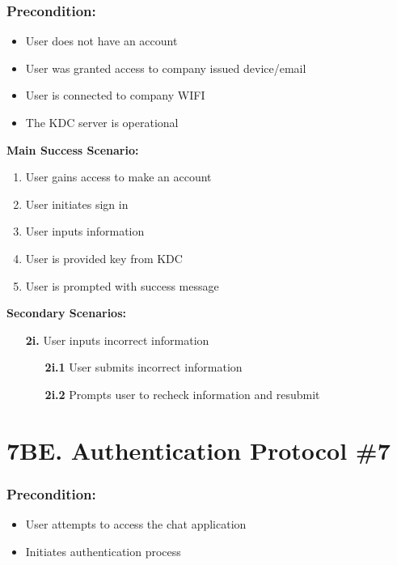 \documentclass[]{article}
\begin{document}
\subsubsection*{Precondition:}
\begin{itemize}
	\item User does not have an account
	\item User was granted access to company issued device/email
	\item User is connected to company WIFI
	\item The KDC server is operational
\end{itemize}
\textbf{Main Success Scenario:}
\begin{enumerate}
	\item User gains access to make an account
	\item User initiates sign in
	\item User inputs information
	\item User is provided key from KDC
	\item User is prompted with success message
\end{enumerate}
\textbf{Secondary Scenarios:}
\begin{enumerate}
	\item[\textbf{2i.}] User inputs incorrect information
		\begin{enumerate}
			\item[\textbf{2i.1}] User submits incorrect information
			\item[\textbf{2i.2}] Prompts user to recheck information and resubmit
		\end{enumerate}
\end{enumerate}

\section*{7BE. Authentication Protocol \#7}
\subsubsection*{Precondition:}
\begin{itemize}
	\item User attempts to access the chat application
	\item Initiates authentication process
\end{itemize}
\end{document}
